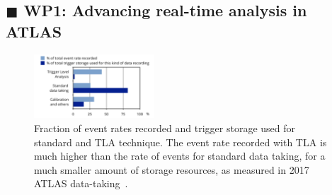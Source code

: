 \documentclass[11pt,a4paper]{article}
\begin{document}



\subsection*{\color{teal} $\blacksquare$ \color{black} WP1: Advancing real-time analysis in ATLAS}

\begin{figure} \includegraphics[width=0.4\textwidth]{figs/TLAPEB}
\caption{\label{fig:TLAPEB} \small Fraction of event rates recorded and trigger storage used for standard and TLA technique. 
The event rate recorded with TLA is much higher than the rate of events for standard data taking, for a much smaller amount of storage resources, as measured in 2017 ATLAS data-taking~\cite{ATLASComputing}. \scriptsize }
\end{figure}
\end{document}
